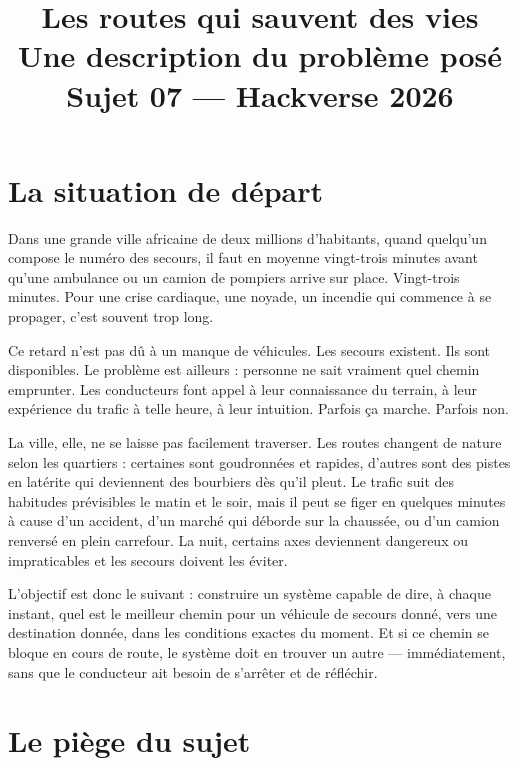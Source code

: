 \documentclass[12pt, a4paper]{article}
\title{
  \textbf{Les routes qui sauvent des vies}\\[0.6em]
  \large Une description du problème posé\\[0.3em]
  \normalsize Sujet 07 — Hackverse 2026
}
\author{}
\date{}
\begin{document}
\maketitle
\vspace{-1em}
\tableofcontents
\newpage


\section{La situation de départ}

Dans une grande ville africaine de deux millions d'habitants, quand
quelqu'un compose le numéro des secours, il faut en moyenne vingt-trois
minutes avant qu'une ambulance ou un camion de pompiers arrive sur place.
Vingt-trois minutes. Pour une crise cardiaque, une noyade, un incendie
qui commence à se propager, c'est souvent trop long.

Ce retard n'est pas dû à un manque de véhicules. Les secours existent.
Ils sont disponibles. Le problème est ailleurs : personne ne sait vraiment
quel chemin emprunter. Les conducteurs font appel à leur connaissance du
terrain, à leur expérience du trafic à telle heure, à leur intuition.
Parfois ça marche. Parfois non.

La ville, elle, ne se laisse pas facilement traverser. Les routes changent
de nature selon les quartiers : certaines sont goudronnées et rapides,
d'autres sont des pistes en latérite qui deviennent des bourbiers dès
qu'il pleut. Le trafic suit des habitudes prévisibles le matin et le soir,
mais il peut se figer en quelques minutes à cause d'un accident, d'un
marché qui déborde sur la chaussée, ou d'un camion renversé en plein
carrefour. La nuit, certains axes deviennent dangereux ou impraticables
et les secours doivent les éviter.

\begin{encadre}
L'objectif est donc le suivant : construire un système capable de dire,
à chaque instant, quel est le meilleur chemin pour un véhicule de secours
donné, vers une destination donnée, dans les conditions exactes du moment.
Et si ce chemin se bloque en cours de route, le système doit en trouver un
autre — immédiatement, sans que le conducteur ait besoin de s'arrêter et
de réfléchir.
\end{encadre}


\section{Le piège du sujet}
\end{document}
